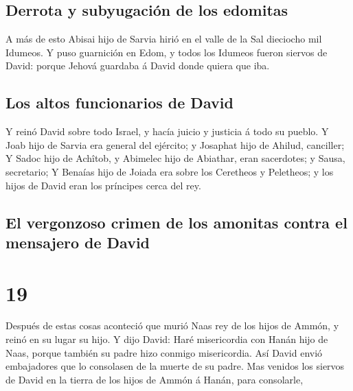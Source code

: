 \hypertarget{derrota-y-subyugaciuxf3n-de-los-edomitas}{%
\subsection{Derrota y subyugación de los
edomitas}\label{derrota-y-subyugaciuxf3n-de-los-edomitas}}

 A más de esto Abisai hijo de Sarvia hirió en el valle de
la Sal dieciocho mil Idumeos.  Y puso guarnición en Edom,
y todos los Idumeos fueron siervos de David: porque Jehová guardaba á
David donde quiera que iba.

\hypertarget{los-altos-funcionarios-de-david}{%
\subsection{Los altos funcionarios de
David}\label{los-altos-funcionarios-de-david}}

 Y reinó David sobre todo Israel, y hacía juicio y
justicia á todo su pueblo.  Y Joab hijo de Sarvia era
general del ejército; y Josaphat hijo de Ahilud, canciller;
 Y Sadoc hijo de Achîtob, y Abimelec hijo de Abiathar,
eran sacerdotes; y Sausa, secretario;  Y Benaías hijo de
Joiada era sobre los Ceretheos y Peletheos; y los hijos de David eran
los príncipes cerca del rey.

\hypertarget{el-vergonzoso-crimen-de-los-amonitas-contra-el-mensajero-de-david}{%
\subsection{El vergonzoso crimen de los amonitas contra el mensajero de
David}\label{el-vergonzoso-crimen-de-los-amonitas-contra-el-mensajero-de-david}}

\hypertarget{section-13-19}{%
\section{19}\label{section-13-19}}

 Después de estas cosas aconteció que murió Naas rey de
los hijos de Ammón, y reinó en su lugar su hijo.  Y dijo
David: Haré misericordia con Hanán hijo de Naas, porque también su padre
hizo conmigo misericordia. Así David envió embajadores que lo consolasen
de la muerte de su padre. Mas venidos los siervos de David en la tierra
de los hijos de Ammón á Hanán, para consolarle,

